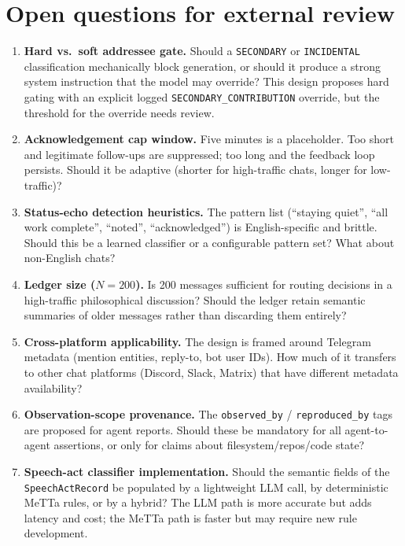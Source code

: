 \documentclass[11pt]{article}
\begin{document}
\section{Open questions for external review}

\begin{enumerate}
\item \textbf{Hard vs.\ soft addressee gate.}  Should a \texttt{SECONDARY} or
\texttt{INCIDENTAL} classification mechanically block generation, or should
it produce a strong system instruction that the model may override?  This
design proposes hard gating with an explicit logged
\texttt{SECONDARY\_CONTRIBUTION} override, but the threshold for the override
needs review.

\item \textbf{Acknowledgement cap window.}  Five minutes is a placeholder.
Too short and legitimate follow-ups are suppressed; too long and the
feedback loop persists.  Should it be adaptive (shorter for high-traffic
chats, longer for low-traffic)?

\item \textbf{Status-echo detection heuristics.}  The pattern list (``staying
quiet'', ``all work complete'', ``noted'', ``acknowledged'') is
English-specific and brittle.  Should this be a learned classifier or a
configurable pattern set?  What about non-English chats?

\item \textbf{Ledger size ($N=200$).}  Is 200 messages sufficient for
routing decisions in a high-traffic philosophical discussion?  Should the
ledger retain semantic summaries of older messages rather than discarding
them entirely?

\item \textbf{Cross-platform applicability.}  The design is framed around
Telegram metadata (mention entities, reply-to, bot user IDs).  How much of
it transfers to other chat platforms (Discord, Slack, Matrix) that have
different metadata availability?

\item \textbf{Observation-scope provenance.}  The
\texttt{observed\_by} / \texttt{reproduced\_by} tags are proposed for agent
reports.  Should these be mandatory for all agent-to-agent assertions, or
only for claims about filesystem/repos/code state?

\item \textbf{Speech-act classifier implementation.}  Should the semantic
fields of the \texttt{SpeechActRecord} be populated by a lightweight LLM
call, by deterministic MeTTa rules, or by a hybrid?  The LLM path is more
accurate but adds latency and cost; the MeTTa path is faster but may require
new rule development.
\end{enumerate}
\end{document}
